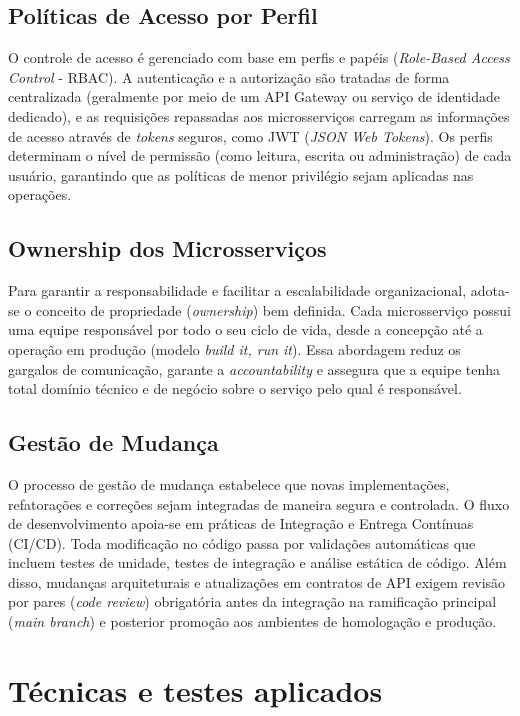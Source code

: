 \subsection{Políticas de Acesso por Perfil}

O controle de acesso é gerenciado com base em perfis e papéis (\textit{Role-Based Access Control} - RBAC). A autenticação e a autorização são tratadas de forma centralizada (geralmente por meio de um API Gateway ou serviço de identidade dedicado), e as requisições repassadas aos microsserviços carregam as informações de acesso através de \textit{tokens} seguros, como JWT (\textit{JSON Web Tokens}). Os perfis determinam o nível de permissão (como leitura, escrita ou administração) de cada usuário, garantindo que as políticas de menor privilégio sejam aplicadas nas operações.

\subsection{Ownership dos Microsserviços}

Para garantir a responsabilidade e facilitar a escalabilidade organizacional, adota-se o conceito de propriedade (\textit{ownership}) bem definida. Cada microsserviço possui uma equipe responsável por todo o seu ciclo de vida, desde a concepção até a operação em produção (modelo \textit{build it, run it}). Essa abordagem reduz os gargalos de comunicação, garante a \textit{accountability} e assegura que a equipe tenha total domínio técnico e de negócio sobre o serviço pelo qual é responsável.

\subsection{Gestão de Mudança}

O processo de gestão de mudança estabelece que novas implementações, refatorações e correções sejam integradas de maneira segura e controlada. O fluxo de desenvolvimento apoia-se em práticas de Integração e Entrega Contínuas (CI/CD). Toda modificação no código passa por validações automáticas que incluem testes de unidade, testes de integração e análise estática de código. Além disso, mudanças arquiteturais e atualizações em contratos de API exigem revisão por pares (\textit{code review}) obrigatória antes da integração na ramificação principal (\textit{main branch}) e posterior promoção aos ambientes de homologação e produção.

\section{Técnicas e testes aplicados}

